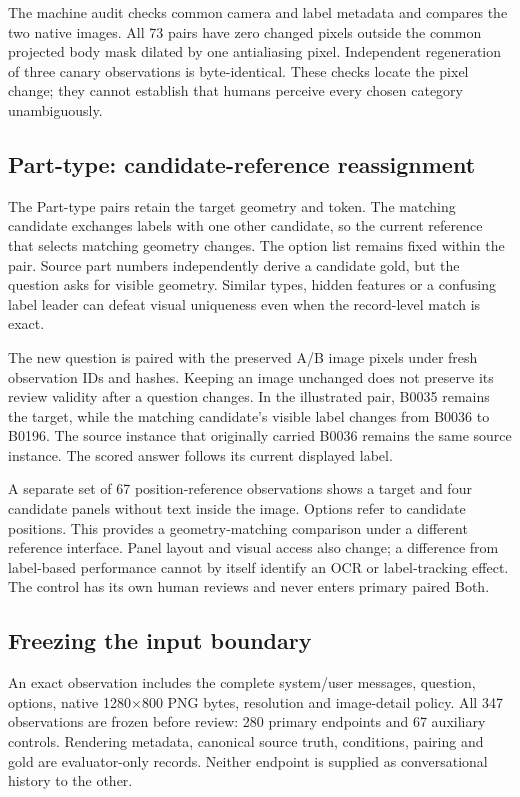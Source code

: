 \documentclass[10pt,twocolumn,letterpaper]{article}
\begin{document}
The machine audit checks common camera and label metadata and compares
the two native images. All 73 pairs have zero changed pixels outside
the common projected body mask dilated by one antialiasing pixel.
Independent regeneration of three canary observations is byte-identical.
These checks locate the pixel change; they cannot establish that
humans perceive every chosen category unambiguously.

\subsection{Part-type: candidate-reference reassignment}
The \EvType{} Part-type pairs retain the target geometry and token.
The matching candidate exchanges labels with one other candidate,
so the current reference that selects matching geometry changes.
The option list remains fixed within the pair. Source part numbers
independently derive a candidate gold, but the question asks for visible
geometry. Similar types, hidden features or a confusing label leader
can defeat visual uniqueness even when the record-level match is exact.

The new question is paired with the preserved A/B image pixels under
fresh observation IDs and hashes. Keeping an image unchanged does
not preserve its review validity after a question changes. In the
illustrated pair, B0035 remains the target, while the matching
candidate's visible label changes from B0036 to B0196. The source
instance that originally carried B0036 remains the same source
instance. The scored answer follows its current displayed label.

A separate set of 67 position-reference observations shows a target
and four candidate panels without text inside the image. Options
refer to candidate positions. This provides a geometry-matching
comparison under a different reference interface. Panel layout and
visual access also change; a difference from label-based performance
cannot by itself identify an OCR or label-tracking effect. The control
has its own human reviews and never enters primary paired Both.

\subsection{Freezing the input boundary}
An exact observation includes the complete system/user messages,
question, options, native 1280$\times$800 PNG bytes, resolution and
image-detail policy. All 347 observations are frozen before review:
280 primary endpoints and 67 auxiliary controls. Rendering metadata,
canonical source truth, conditions, pairing and gold are evaluator-only
records. Neither endpoint is supplied as conversational history to the
other.
\end{document}
